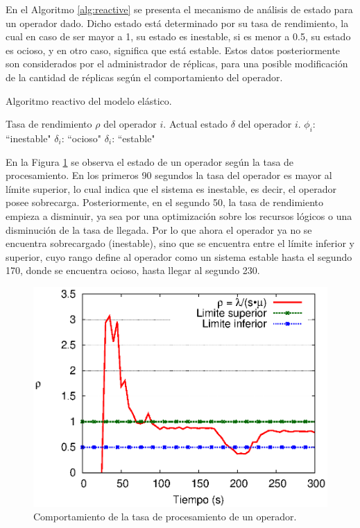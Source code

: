 En el Algoritmo \ref{alg:reactive} se presenta el mecanismo de análisis de estado para un operador dado. Dicho estado está determinado por su tasa de rendimiento, la cual en caso de ser mayor a 1, su estado es inestable, si es menor a 0.5, su estado es ocioso, y en otro caso, significa que está estable. Estos datos posteriormente son considerados por el administrador de réplicas, para una posible modificación de la cantidad de réplicas según el comportamiento del operador.

\begin{algorithm}[!ht]
	\caption{Algoritmo reactivo del modelo elástico.}
	\label{alg:reactive}
	\begin{algorithmic}[1]
	\REQUIRE Tasa de rendimiento $\rho$ del operador $i$.
	\ENSURE Actual estado $\delta$ del operador $i$.
		\RETURN $\phi_i$: ``inestable"
		\RETURN $\delta_i$: ``ocioso"
	\ELSE
		\RETURN $\delta_i$: ``estable"
	\ENDIF
	\end{algorithmic}
\end{algorithm}

En la Figura \ref{fig:umbrales} se observa el estado de un operador según la tasa de procesamiento. En los primeros 90 segundos la tasa del operador es mayor al límite superior, lo cual indica que el sistema es inestable, es decir, el operador posee sobrecarga. Posteriormente, en el segundo 50, la tasa de rendimiento empieza a disminuir, ya sea por una optimización sobre los recursos lógicos o una disminución de la tasa de llegada. \normalsize{Por lo que ahora el operador ya no se encuentra sobrecargado (inestable), sino que se encuentra entre el límite inferior y superior, cuyo rango define al operador como un sistema estable hasta el segundo 170, donde se encuentra ocioso, hasta llegar al segundo 230.}

\begin{figure}[ht!]
  \centering
    \includegraphics[scale=0.8]{images/Umbrales.eps}
  \caption{Comportamiento de la tasa de procesamiento de un operador.}
  \label{fig:umbrales}
\end{figure}


